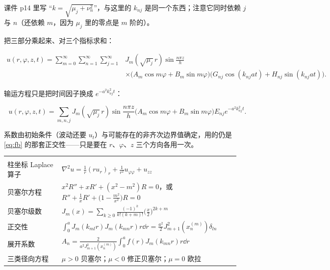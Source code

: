 课件 p14 里写 “$k=\sqrt{\mu_j+\nu_n^2}$”，与这里的 $k_{nj}$ 是同一个东西；注意它同时依赖 $j$ 与 $n$（还依赖 $m$，因为 $\mu_j$ 里的零点是 $m$ 阶的）。


把三部分乘起来、对三个指标求和：

\begin{equation}
\begin{aligned}
u(r,\varphi,z,t)=\sum_{m=0}^{\infty}\sum_{n=1}^{\infty}\sum_{j=1}^{\infty}&J_m(\sqrt{\mu_j}\,r)\sin\frac{n\pi z}{h}\\
&\times\big(A_m\cos m\varphi+B_m\sin m\varphi\big)\big(G_{nj}\cos(k_{nj}at)+H_{nj}\sin(k_{nj}at)\big).
\end{aligned}
\label{eq:triple}
\end{equation}

输运方程只是把时间因子换成 $e^{-a^2k_{nj}^2t}$：

\begin{equation}
u(r,\varphi,z,t)=\sum_{m,n,j}J_m(\sqrt{\mu_j}\,r)\sin\frac{n\pi z}{h}\big(A_m\cos m\varphi+B_m\sin m\varphi\big)E_{nj}e^{-a^2k_{nj}^2t}.
\label{eq:tripleheat}
\end{equation}

系数由初始条件（波动还要 $u_t$）与可能存在的非齐次边界值确定，用的仍是 \eqref{eq:fb} 的那套正交性——只是要在 $r$、$\varphi$、$z$ 三个方向各用一次。



\label{sec:836}



\begin{center}
\tabtop
\begin{tabular}{@{}L{0.22\linewidth}L{0.72\linewidth}@{}}
 &  \\
\tabmidrule
柱坐标 Laplace 算子 & $\nabla^2u=\frac1r(ru_r)_r+\frac1{r^2}u_{\varphi\varphi}+u_{zz}$ \\
贝塞尔方程 & $x^2R''+xR'+(x^2-m^2)R=0$，或 $R''+\frac1xR'+\big(1-\frac{m^2}{x^2}\big)R=0$ \\
贝塞尔级数 & $J_m(x)=\sum_{k\ge0}\frac{(-1)^k}{k!(k+m)!}\big(\frac x2\big)^{2k+m}$ \\
正交性 & $\int_0^aJ_m(k_{ml}r)J_m(k_{mn}r)r\dd r=\frac{a^2}2J_{m+1}^2(x_n^{(m)})\delta_{ln}$ \\
展开系数 & $A_n=\frac{2}{a^2J_{m+1}^2(x_n^{(m)})}\int_0^af(r)J_m(k_{mn}r)r\dd r$ \\
三类径向方程 & $\mu>0$ 贝塞尔；$\mu<0$ 修正贝塞尔；$\mu=0$ 欧拉 \\
\end{tabular}
\tabbot
\end{center}


